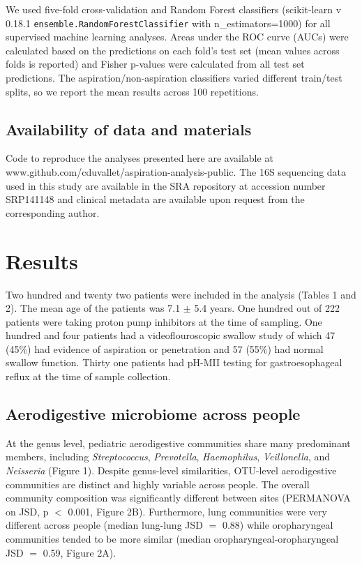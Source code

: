 We used five-fold cross-validation and Random Forest classifiers (scikit-learn v 0.18.1 \newline \texttt{ensemble.RandomForestClassifier} with n\_estimators=1000) for all supervised machine learning analyses.
Areas under the ROC curve (AUCs) were calculated based on the predictions on each fold's test set (mean values across folds is reported) and Fisher p-values were calculated from all test set predictions.
The aspiration/non-aspiration classifiers varied different train/test splits, so we report the mean results across 100 repetitions.

\subsection{Availability of data and materials}
Code to reproduce the analyses presented here are available at www.github.com/cduvallet/aspiration-analysis-public.
The 16S sequencing data used in this study are available in the SRA repository at accession number SRP141148 and clinical metadata are available upon request from the corresponding author.

\section{Results}

Two hundred and twenty two patients were included in the analysis (Tables 1 and 2).
The mean age of the patients was 7.1 $\pm$ 5.4 years.
One hundred out of 222 patients were taking proton pump inhibitors at the time of sampling.
One hundred and four patients had a videoflouroscopic swallow study of which 47 (45\%) had evidence of aspiration or penetration and 57 (55\%) had normal swallow function.
Thirty one patients had pH-MII testing for gastroesophageal reflux at the time of sample collection.

\subsection{Aerodigestive microbiome across people}

At the genus level, pediatric aerodigestive communities share many predominant members, including \textit{Streptococcus}, \textit{Prevotella}, \textit{Haemophilus}, \textit{Veillonella}, and \textit{Neisseria} (Figure 1).
Despite genus-level similarities, OTU-level aerodigestive communities are distinct and highly variable across people.
The overall community composition was significantly different between sites (PERMANOVA on JSD, p $<$ 0.001, Figure 2B).
Furthermore, lung communities were very different across people (median lung-lung JSD $=$ 0.88) while oropharyngeal communities tended to be more similar (median oropharyngeal-oropharyngeal JSD $=$ 0.59, Figure 2A).

